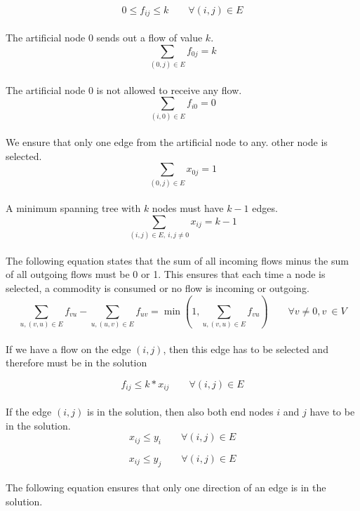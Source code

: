 \begin{equation}
  0 \leq f_{ij} \leq k \qquad \forall (i,j) \in E
\end{equation}
\\
The artificial node $0$ sends out a flow of value $k$.
\begin{equation}
  \sum_{(0,j) \in E} f_{0j} = k 
\end{equation}
\\
The artificial node $0$ is not allowed to receive any flow.
\begin{equation}
  \sum_{(i,0) \in E} f_{i0} = 0 
\end{equation}
\\
We ensure that only one edge from the artificial node to any.
other node is selected.
\begin{equation}
  \sum_{(0,j) \in E} x_{0j} = 1 
\end{equation}
\\
A minimum spanning tree with $k$ nodes must have $k-1$ edges.
\begin{equation}
  \sum_{(i,j) \in E, \ i,j \not =  0} x_{ij} = k-1 
\end{equation}
\\
The following equation states that the sum of all incoming flows minus the sum of all outgoing flows must be 0 or 1. This ensures that each time a node is selected, a commodity is consumed or no flow is incoming or outgoing.
\begin{equation}
  \sum_{u, (v,u) \in E} f_{vu} - \sum_{u, (u,v) \in E} f_{uv} = \min (1, \sum_{u, (v,u) \in E} f_{vu}) \qquad  \forall v \not = 0, v \ \in V
\end{equation}
\\
If we have a flow on the edge $(i,j)$, then this edge has to be selected and therefore must be in the solution

\begin{equation}
  f_{ij} \leq k * x_{ij} \qquad \forall (i,j) \in E 
\end{equation}
\\
If the edge $(i,j)$ is in the solution, then also both end nodes $i$ and $j$ 
have to be in the solution.
\begin{equation}
  x_{ij} \leq y_{i} \qquad \forall (i,j) \in E
  \label{lbl:xy1}
\end{equation}

\begin{equation}
  x_{ij} \leq y_{j} \qquad \forall (i,j) \in E
  \label{lbl:xy2}
\end{equation}
\\
The following equation ensures that only one direction of an edge is in the solution.

